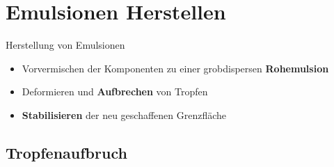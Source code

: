 \documentclass{beamer} %
\begin{document}
\section{Emulsionen Herstellen}

\begin{frame}{Herstellung von Emulsionen}
	\begin{block}{}
		\begin{itemize}
			\item Vorvermischen der Komponenten zu einer grobdispersen \textbf{Rohemulsion}\pause
			\item Deformieren und \textbf{Aufbrechen} von Tropfen\pause
			\item \textbf{Stabilisieren} der neu geschaffenen Grenzfläche
		\end{itemize}
	\end{block}
\end{frame}

\subsection{Tropfenaufbruch}
\end{document}

